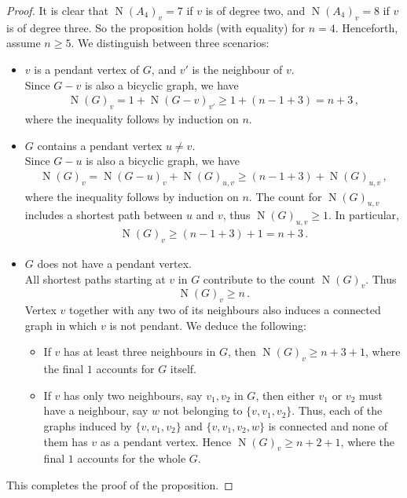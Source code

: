 \documentclass[a4paper,12pt]{amsart}
\theoremstyle{remark}
\DeclareMathOperator{\N}{N}
\begin{document}
\begin{proof}
It is clear that $\N(A_4)_v=7$ if $v$ is of degree two, and  $\N(A_4)_v=8$ if $v$ is of degree three. So the proposition holds (with equality) for $n=4$. Henceforth, assume $n\geq 5$. We distinguish between three scenarios:
\begin{itemize}
\item $v$ is a pendant vertex of $G$, and $v'$ is the neighbour of $v$.\\
Since $G-v$ is also a bicyclic graph, we have
\begin{align*}
\N(G)_v=1+\N(G-v)_{v'} \geq 1+ (n-1+3)=n+3\,,
\end{align*}
where the inequality follows by induction on $n$.
\item $G$ contains a pendant vertex $u \neq v$.\\
Since $G-u$ is also a bicyclic graph, we have
\begin{align*}
\N(G)_v=\N(G-u)_v + \N(G)_{u,v} \geq (n-1+3)  + \N(G)_{u,v} \,,
\end{align*}
where the inequality follows by induction on $n$. The count for $\N(G)_{u,v}$ includes a shortest path between $u$ and $v$, thus $\N(G)_{u,v} \geq 1$. In particular,
\begin{align*}
\N(G)_v \geq  (n-1+3)  + 1 = n+3\,.
\end{align*}
\item $G$ does not have a pendant vertex.\\
All shortest paths starting at $v$ in $G$ contribute to the count $\N(G)_v$. Thus
$$\N(G)_v \geq n\,.$$
Vertex $v$ together with any two of its neighbours also induces a connected graph in which $v$ is not pendant. We deduce the following:
\begin{itemize}
\item If $v$ has at least three neighbours in $G$, then $\N(G)_v \geq n +3 +1$, where the final $1$ accounts for $G$ itself.
\item If $v$ has only two neighbours, say $v_1,v_2$ in $G$, then either $v_1$ or $v_2$ must have a neighbour, say $w$ not belonging to $\{v,v_1,v_2\}$. Thus, each of the graphs induced by $\{v,v_1,v_2\}$ and $\{v,v_1,v_2,w\}$ is connected and none of them has $v$ as a pendant vertex. Hence  $\N(G)_v \geq n +2 +1$, where the final $1$ accounts for the whole $G$.
\end{itemize}
\end{itemize}
This completes the proof of the proposition.
\end{proof}
\end{document}
